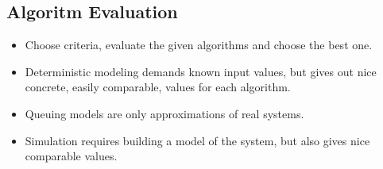 \documentclass[a4wide,10pt]{article}
\begin{document}
\subsection{Algoritm Evaluation} %
\label{sub:algoritm_evaluation}
\begin{itemize}
	\item Choose criteria, evaluate the given algorithms and choose the best one.
	\item Deterministic modeling demands known input values, but gives out nice concrete, easily comparable, values for each algorithm.
	\item Queuing models are only approximations of real systems.
	\item Simulation requires building a model of the system, but also gives nice comparable values. 
\end{itemize}
\end{document}
